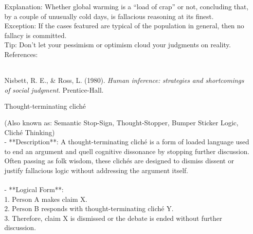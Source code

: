 \documentclass[a4paper,12pt,single,pdftex]{scrartcl}
\begin{document}
    
      Explanation: Whether global warming is a “load of crap” or not, concluding that, by a couple of unusually cold days, is fallacious reasoning at its finest.
    \\

    
      Exception: If the cases featured are typical of the population in general, then no fallacy is committed.
    \\

    
      Tip: Don’t let your pessimism or optimism cloud your judgments on reality.
    \\

    References:

    
      
        
      \\

      
        
          Nisbett, R. E., \& Ross, L. (1980). {\it Human inference: strategies and shortcomings of social judgment}. Prentice-Hall.
        
      
    
  

Thought-terminating cliché
    
      (Also known as: Semantic Stop-Sign, Thought-Stopper, Bumper Sticker Logic, Cliché Thinking)
    \\

  
    
      - **Description**: A thought-terminating cliché is a form of loaded language used to end an argument and quell cognitive dissonance by stopping further discussion. Often passing as folk wisdom, these clichés are designed to dismiss dissent or justify fallacious logic without addressing the argument itself.
    \\

    
      
    \\

    
      - **Logical Form**:
    \\

    
        1. Person A makes claim X.
    \\

    
        2. Person B responds with thought-terminating cliché Y.
    \\

    
        3. Therefore, claim X is dismissed or the debate is ended without further discussion.
    \\
\end{document}
